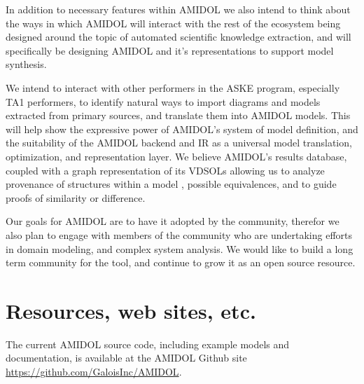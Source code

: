 \documentclass[11pt]{article}
\newcommand{\amidol}{\textsc{AMIDOL}}
\begin{document}
In addition to necessary features within \amidol{} we also intend to
think about the ways in which \amidol{} will interact with the rest of
the ecosystem being designed around the topic of automated scientific
knowledge extraction, and will specifically be designing \amidol{} and
it's representations to support model synthesis.

We intend to interact with other performers in the ASKE program,
especially TA1 performers, to identify natural ways to import diagrams
and models extracted from primary sources, and translate them into
\amidol{} models.  This will help show the expressive power of
\amidol{}'s system of model definition, and the suitability of the
\amidol{} backend and IR as a universal model translation,
optimization, and representation layer.  We believe \amidol{}'s
results database, coupled with a graph representation of its VDSOLs
allowing us to analyze provenance of structures within a model
\cite{wright2018quine}, possible equivalences, and to guide proofs of
similarity or difference.

Our goals for \amidol{} are to have it adopted by the community,
therefor we also plan to engage with members of the community who are
undertaking efforts in domain modeling, and complex system analysis.
We would like to build a long term community for the tool, and
continue to grow it as an open source resource.

\section{Resources, web sites, etc.}

The current \amidol{} source code, including example models and documentation, is available at the \amidol{} Github site \url{https://github.com/GaloisInc/AMIDOL}.


\end{document}
